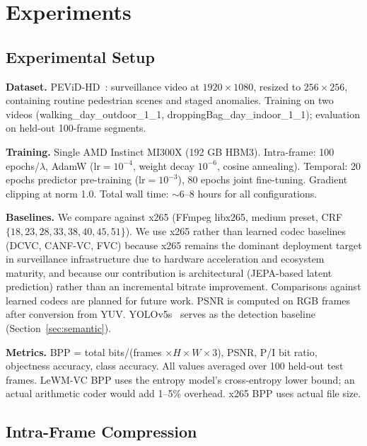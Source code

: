 \documentclass{article}
\begin{document}
\section{Experiments}
\label{sec:experiments}

\subsection{Experimental Setup}

\textbf{Dataset.} PEViD-HD~\cite{korshunov2013pevid}: surveillance video at $1920{\times}1080$, resized to $256{\times}256$, containing routine pedestrian scenes and staged anomalies. Training on two videos (walking\_day\_outdoor\_1\_1, droppingBag\_day\_indoor\_1\_1); evaluation on held-out 100-frame segments.

\textbf{Training.} Single AMD Instinct MI300X (192 GB HBM3). Intra-frame: 100 epochs/$\lambda$, AdamW ($\text{lr}{=}10^{-4}$, weight decay $10^{-6}$, cosine annealing). Temporal: 20 epochs predictor pre-training ($\text{lr}{=}10^{-3}$), 80 epochs joint fine-tuning. Gradient clipping at norm 1.0. Total wall time: ${\sim}$6--8 hours for all configurations.

\textbf{Baselines.} We compare against x265 (FFmpeg libx265, medium preset, CRF $\{18, 23, 28, 33, 38, 40, 45, 51\}$). We use x265 rather than learned codec baselines (DCVC, CANF-VC, FVC) because x265 remains the dominant deployment target in surveillance infrastructure due to hardware acceleration and ecosystem maturity, and because our contribution is architectural (JEPA-based latent prediction) rather than an incremental bitrate improvement. Comparisons against learned codecs are planned for future work. PSNR is computed on RGB frames after conversion from YUV. YOLOv5s~\cite{jocher2020yolov5,redmon2018yolov3} serves as the detection baseline (Section~\ref{sec:semantic}).

\textbf{Metrics.} BPP = total bits/(frames $\times H \times W \times 3$), PSNR, P/I bit ratio, objectness accuracy, class accuracy. All values averaged over 100 held-out test frames. LeWM-VC BPP uses the entropy model's cross-entropy lower bound; an actual arithmetic coder would add 1--5\% overhead. x265 BPP uses actual file size.

\subsection{Intra-Frame Compression}
\label{sec:intra}
\end{document}
